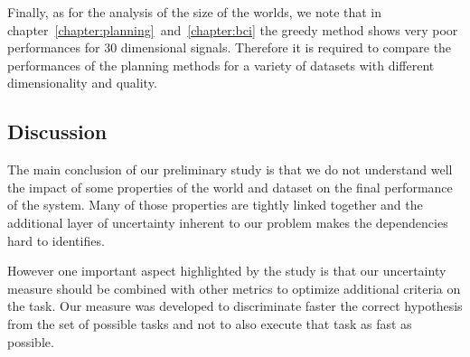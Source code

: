 Finally, as for the analysis of the size of the worlds, we note that in chapter~\ref{chapter:planning}~and~\ref{chapter:bci} the greedy method shows very poor performances for 30 dimensional signals. Therefore it is required to compare the performances of the planning methods for a variety of datasets with different dimensionality and quality.

\subsection{Discussion}

The main conclusion of our preliminary study is that we do not understand well the impact of some properties of the world and dataset on the final performance of the system. Many of those properties are tightly linked together and the additional layer of uncertainty inherent to our problem makes the dependencies hard to identifies.

However one important aspect highlighted by the study is that our uncertainty measure should be combined with other metrics to optimize additional criteria on the task. Our measure was developed to discriminate faster the correct hypothesis from the set of possible tasks and not to also execute that task as fast as possible.

